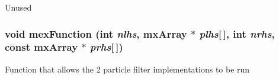 \label{ex__particle__CUDA__naive__full_8cu_ae66f6b31b5ad750f1fe042a706a4e3d4}
Unused \hypertarget{ex__particle__CUDA__naive__full_8cu_a6a215cbfde54f82a3ce599228fc3fce5}{
\subsubsection[{mexFunction}]{\setlength{\rightskip}{0pt plus 5cm}void mexFunction (int {\em nlhs}, \/  mxArray $\ast$ {\em plhs}\mbox{[}$\,$\mbox{]}, \/  int {\em nrhs}, \/  const mxArray $\ast$ {\em prhs}\mbox{[}$\,$\mbox{]})}}
\label{ex__particle__CUDA__naive__full_8cu_a6a215cbfde54f82a3ce599228fc3fce5}
Function that allows the 2 particle filter implementations to be run


